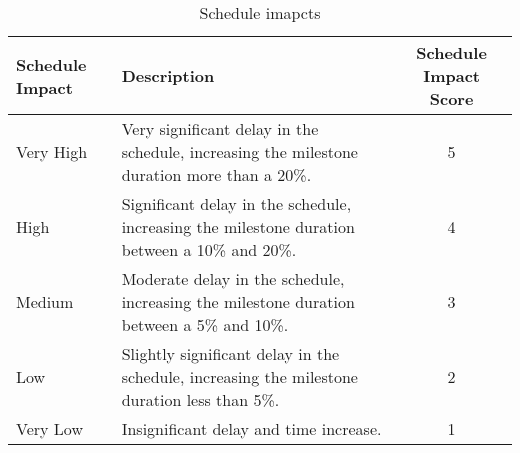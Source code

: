 	
\begin{table}[H]
	\centering
	\begin{tabular}{l >{\raggedright\arraybackslash}p{6.6cm} c}
		
		\toprule[2pt]
		
		\textbf{Schedule Impact} &  \textbf{Description}  & \textbf{Schedule Impact Score}\\
		
		\midrule [1.5pt]
		
		Very High & Very significant delay in the schedule, increasing the milestone duration more than a 20\%.  & 5\vspace{0.2cm} \\
		
		\midrule
		
		High & Significant delay in the schedule, increasing the milestone duration between a 10\% and 20\%. & 4\vspace{0.2cm} \\
		
		\midrule
		
		Medium & Moderate delay in the schedule, increasing the milestone duration between a 5\% and 10\%. & 3\vspace{0.2cm} \\
	
		\midrule
	
		Low & Slightly significant delay in the schedule, increasing the milestone duration less than 5\%. & 2\vspace{0.2cm} \\
	
		\midrule
	
		Very Low & Insignificant delay and time increase. & 1\vspace{0.2cm} \\
			
		\bottomrule[2pt]
	
	\end{tabular}
	\caption{Schedule imapcts}
\end{table}
	

